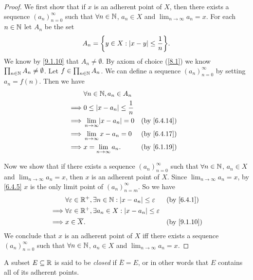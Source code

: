 \begin{proof}
  We first show that if \(x\) is an adherent point of \(X\), then there exists a sequence \((a_n)_{n = 0}^\infty\) such that \(\forall n \in \mathbb{N}\), \(a_n \in X\) and \(\lim_{n \to \infty} a_n = x\).
  For each \(n \in \mathbb{N}\) let \(A_n\) be the set
  \[
    A_n = \set{y \in X : \abs{x - y} \leq \dfrac{1}{n}}.
  \]
  We know by \cref{9.1.10} that \(A_n \neq \emptyset\).
  By axiom of choice (\cref{8.1}) we know \(\prod_{n \in \mathbb{N}} A_n \neq \emptyset\).
  Let \(f \in \prod_{n \in \mathbb{N}} A_n\).
  We can define a sequence \((a_n)_{n = 0}^\infty\) by setting \(a_n = f(n)\).
  Then we have
  \begin{align*}
             & \forall n \in \N, a_n \in A_n                           \\
    \implies & 0 \leq \abs{x - a_n} \leq \dfrac{1}{n}                  \\
    \implies & \lim_{n \to \infty} \abs{x - a_n} = 0  &  & \by{6.4.14} \\
    \implies & \lim_{n \to \infty} x - a_n = 0        &  & \by{6.4.17} \\
    \implies & x = \lim_{n \to \infty} a_n.           &  & \by{6.1.19}
  \end{align*}

  Now we show that if there exists a sequence \((a_n)_{n = 0}^\infty\) such that \(\forall n \in \mathbb{N}\), \(a_n \in X\) and \(\lim_{n \to \infty} a_n = x\), then \(x\) is an adherent point of \(X\).
  Since \(\lim_{n \to \infty} a_n = x\), by \cref{6.4.5} \(x\) is the only limit point of \((a_n)_{n = m}^\infty\).
  So we have
  \begin{align*}
             & \forall \varepsilon \in \R^+, \exists n \in \N : \abs{x - a_n} \leq \varepsilon  &  & \by{6.4.1}  \\
    \implies & \forall \varepsilon \in \R^+, \exists a_n \in X : \abs{x - a_n} \leq \varepsilon                  \\
    \implies & x \in \overline{X}.                                                              &  & \by{9.1.10}
  \end{align*}
  We conclude that \(x\) is an adherent point of \(X\) iff there exists a sequence \((a_n)_{n = 0}^\infty\) such that \(\forall n \in \mathbb{N}\), \(a_n \in X\) and \(\lim_{n \to \infty} a_n = x\).
\end{proof}

\begin{defn}\label{9.1.15}
  A subset \(E \subseteq \mathbb{R}\) is said to be \emph{closed} if \(\overline{E} = E\), or in other words that \(E\) contains all of its adherent points.
\end{defn}

